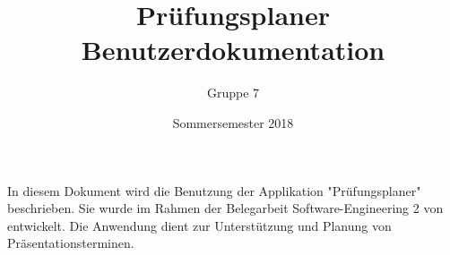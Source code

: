 \documentclass{scrartcl}
\begin{document}
	\title{Prüfungsplaner \\ Benutzerdokumentation}
	\author{Gruppe 7}
	\date{Sommersemester 2018}
	\maketitle
	
	 In diesem Dokument wird die Benutzung der Applikation "Prüfungsplaner" beschrieben. Sie wurde im Rahmen der Belegarbeit Software-Engineering 2 von entwickelt. Die Anwendung dient zur Unterstützung und Planung von Präsentationsterminen.
	
	\tableofcontents
	
	
	
\end{document}
